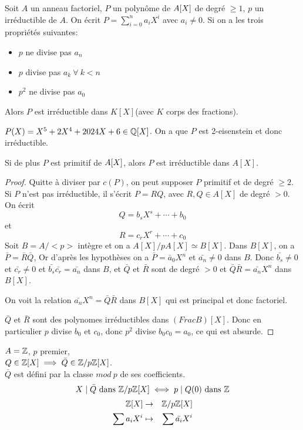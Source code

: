 \begin{theorem}
	Soit $A$ un anneau factoriel, $P$ un polynôme  de $A[X]$ de degré $\geq 1$, $p$ un irréductible de $A$.
	On écrit $P = \sum\limits_{i=0}^n a_iX^i$ avec $a_i \neq 0$. Si on a les trois propriétés suivantes:
	\begin{itemize}
		\item $p$ ne divise pas $a_n$
		\item $p$ divise pas $a_k \ \forall \ k < n$
		\item $p^2$ ne divise pas $a_0$
	\end{itemize}
	Alors $P$ est irréductible dans $K[X]$(avec $K$ corps des fractions).
\end{theorem}

\begin{example}
	$P(X) = X^5 + 2X^4 + 2024X + 6\in \mathbb{Q}[X]$. On a que $P$ est 2-eisenstein et donc irréductible.
\end{example}

\begin{coro}
	Si de plus $P$ est primitif de $A[X]$, alors $P$ est irréductible dans $A[X]$.
\end{coro}


\begin{proof}
    Quitte à diviser par $c(P)$, on peut supposer $P$ primitif et de degré $\geq 2$.
	Si $P$ n'est pas irréductible, il s'écrit $P=RQ$, avec $R, Q \in A[X]$ de degré $>0$.
	On écrit $$Q = b_sX^s + \cdots + b_0$$ et $$R = c_rX^r + \cdots + c_0$$
	Soit $B = A/<p>$ intègre et on a $A[X]/pA[X] \simeq B[X]$.
	Dans $B[X]$, on a $\bar{P} = \bar{R}\bar{Q}$,
	Or d'après les hypothèses on a $\bar{P} = \bar{a}_0X^n$ et $\bar{a_n} \neq 0 $ dans $B$.
	Donc $\bar{b_s} \neq 0$ et $\bar{c_r} \neq 0$ et $\bar{b_s}\bar{c_r} = \bar{a_n}$ dans $B$,
	et $\bar{Q}$ et $\bar{R}$ sont de degré $>0$ et $\bar{Q}\bar{R} = \bar{a_n}X^n$ dans $B[X]$.

	On voit la relation $\bar{a_n}X^n= \bar{Q}\bar{R}$ dans $B[X]$ qui est principal et donc factoriel.


    $\bar{Q}$ et $\bar{R}$ sont des polynomes irréductibles dans $(Frac B)[X]$. Donc en particulier
	$p$ divise $b_0$ et $c_0$, donc $p^2$ divise $b_0c_0 = a_0$, ce qui est absurde.
\end{proof}


\begin{example}
	$A = \mathbb{Z}$, $p$ premier,\\
	$Q \in \mathbb{Z}[X] \implies \bar{Q} \in \mathbb{Z}/p\mathbb{Z}[X]$.\\
	$\bar{Q}$ est défini par la classe $mod\  p$ de ses coefficients.
	$$X \mid \bar{Q} \text{ dans } \mathbb{Z}/p\mathbb{Z}[X] \iff p \mid Q(0) \text{ dans } \mathbb{Z}$$
	\begin{eqnarray*}
		\mathbb{Z}[X] &\to& \mathbb{Z}/p\mathbb{Z}[X] \\
		\sum a_iX^i &\mapsto& \sum \bar{a_i}X^i
	\end{eqnarray*}
\end{example}


